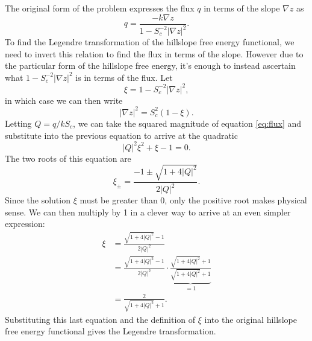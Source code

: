 \documentclass{article}
\theoremstyle{definition}
\theoremstyle{plain}
\begin{document}
The original form of the problem expresses the flux $q$ in terms of the slope $\nabla z$ as
\begin{equation}
    q = \frac{-k\nabla z}{1 - S_c^{-2}|\nabla z|^2}.
    \label{eq:flux}
\end{equation}
To find the Legendre transformation of the hillslope free energy functional, we need to invert this relation to find the flux in terms of the slope.
However due to the particular form of the hillslope free energy, it's enough to instead ascertain what $1 - S_c^{-2}|\nabla z|^2$ is in terms of the flux.
Let
\begin{equation}
\xi = 1 - S_c^{-2}|\nabla z|^2,
\end{equation}
in which case we can then write
\begin{equation}
    |\nabla z|^2 = S_c^2(1 - \xi).
\end{equation}
Letting $Q = q / kS_c$, we can take the squared magnitude of equation \eqref{eq:flux} and substitute into the previous equation to arrive at the quadratic
\begin{equation}
    |Q|^2\xi^2 + \xi - 1 = 0.
\end{equation}
The two roots of this equation are
\begin{equation}
    \xi_{\pm} = \frac{-1 \pm \sqrt{1 + 4|Q|^2}}{2|Q|^2}.
\end{equation}
Since the solution $\xi$ must be greater than 0, only the positive root makes physical sense.
We can then multiply by 1 in a clever way to arrive at an even simpler expression:
\begin{align}
    \xi & = \frac{\sqrt{1 + 4|Q|^2} - 1}{2|Q|^2} \\
    & = \frac{\sqrt{1 + 4|Q|^2} - 1}{2|Q|^2} \cdot \underbrace{\frac{\sqrt{1 + 4|Q|^2} + 1}{\sqrt{1 + 4|Q|^2} + 1}}_{= 1} \\
    & = \frac{2}{\sqrt{1 + 4|Q|^2} + 1}.
\end{align}
Substituting this last equation and the definition of $\xi$ into the original hillslope free energy functional gives the Legendre transformation.



\end{document}
